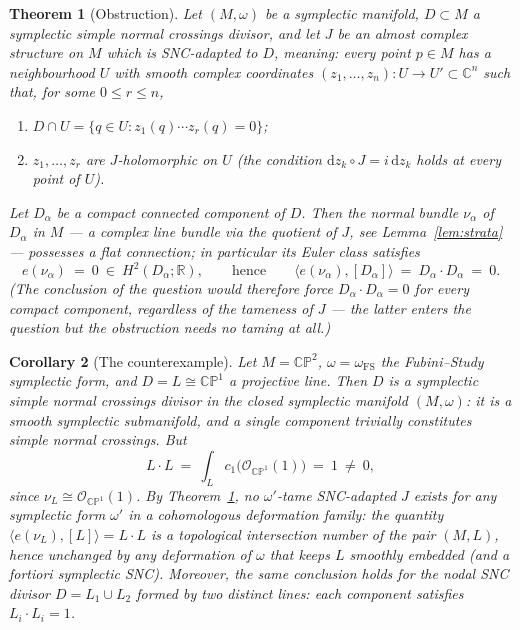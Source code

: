 \documentclass[11pt]{article}
\newtheorem{theorem}{Theorem}[section]
\newtheorem{corollary}[theorem]{Corollary}
\theoremstyle{definition}
\theoremstyle{remark}
\newcommand{\CC}{\mathbb{C}}
\newcommand{\RR}{\mathbb{R}}
\newcommand{\CP}{\mathbb{CP}}
\newcommand{\dd}{\mathrm{d}}
\begin{document}
\begin{theorem}[Obstruction]\label{thm:obstruction}
Let $(M,\omega)$ be a symplectic manifold, $D\subset M$ a symplectic
simple normal crossings divisor, and let $J$ be an almost complex
structure on $M$ which is \emph{SNC-adapted to} $D$, meaning: every
point $p\in M$ has a neighbourhood $U$ with smooth complex
coordinates $(z_1,\ldots,z_n)\colon U\to U'\subset\CC^n$ such that,
for some $0\le r\le n$,
\begin{enumerate}
\item[\normalfont(i)] $D\cap U=\{q\in U:z_1(q)\cdots z_r(q)=0\}$;
\item[\normalfont(ii)] $z_1,\dots,z_r$ are $J$-holomorphic on $U$
(the condition $\dd z_k\circ J=i\,\dd z_k$ holds at every point of
$U$).
\end{enumerate}
Let $D_\alpha$ be a compact connected component of $D$. Then the
normal bundle $\nu_\alpha$ of $D_\alpha$ in $M$ --- a complex line
bundle via the quotient of $J$, see Lemma~\ref{lem:strata} ---
possesses a flat connection; in particular its Euler class satisfies
\[
e(\nu_\alpha)\ =\ 0\ \in\ H^2(D_\alpha;\RR),
\qquad\text{hence}\qquad
\langle e(\nu_\alpha),[D_\alpha]\rangle
\ =\ D_\alpha\cdot D_\alpha\ =\ 0 .
\]
(The conclusion of the question would therefore force
$D_\alpha\cdot D_\alpha=0$ for every compact component, regardless
of the tameness of $J$ --- the latter enters the question but the
obstruction needs no taming at all.)
\end{theorem}

\begin{corollary}[The counterexample]\label{cor:cp2}
Let $M=\CP^2$, $\omega=\omega_{\mathrm{FS}}$ the Fubini--Study
symplectic form, and $D=L\cong\CP^1$ a projective line. Then $D$ is
a symplectic simple normal crossings divisor in the closed symplectic
manifold $(M,\omega)$: it is a smooth symplectic submanifold, and a
single component trivially constitutes simple normal crossings. But
\[
L\cdot L\ =\ \int_L c_1\bigl(\mathcal O_{\CP^1}(1)\bigr)\ =\ 1
\ \neq\ 0 ,
\]
since $\nu_L\cong\mathcal O_{\CP^1}(1)$. By
Theorem~\ref{thm:obstruction}, no $\omega'$-tame SNC-adapted $J$
exists for \emph{any} symplectic form $\omega'$ in a cohomologous
deformation family: the quantity $\langle e(\nu_L),[L]\rangle=L\cdot
L$ is a topological intersection number of the pair $(M,L)$, hence
unchanged by any deformation of $\omega$ that keeps $L$ smoothly
embedded (and a fortiori symplectic SNC). Moreover, the same
conclusion holds for the nodal SNC divisor $D=L_1\cup L_2$ formed by
two distinct lines: each component satisfies
$L_i\cdot L_i=1$.
\end{corollary}
\end{document}
